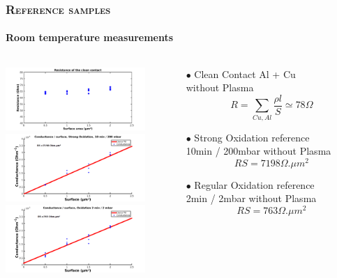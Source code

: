 \documentclass[handout]{beamer}
\begin{document}
    \begin{frame}
        \frametitle{\textsc{Reference samples}}
        \framesubtitle{Room temperature measurements}
        
        \begin{columns}[onlytextwidth]
            \begin{column}{0.5\textwidth}
            \includegraphics[width=150pt]{Rclean.png}\\
                     
            \includegraphics[width=150pt]{ConductanceFitStrongOx.png}\\
                       
            \includegraphics[width=150pt]{ConductanceFitOx.png}
            \end{column}
            
            \begin{column}{0.5\textwidth}
            
            $\bullet$  Clean Contact Al + Cu\\without Plasma\\
            \[R=\sum_{Cu,Al}\dfrac{\rho l}{S}\simeq 78 \Omega\]
            \vspace{0.1cm}
            
            $\bullet$  Strong Oxidation reference\\10min / 200mbar without Plasma\\
            \[RS=7198 \Omega.\mu m^2\]
            \vspace{0.1cm}
            
            $\bullet$  Regular Oxidation reference\\2min / 2mbar without Plasma\\
            \[RS=763 \Omega.\mu m^2\]
            \end{column}
            
        \end{columns}
        
    \end{frame}
    
\end{document}
